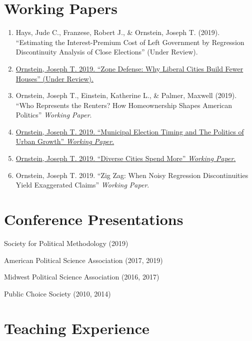 \documentclass[letterpaper]{article}
\renewenvironment{itemize}{
  \begin{list}{}{
    \setlength{\leftmargin}{1.5em}
  }
}{
  \end{list}
}
\begin{document}
\section*{Working Papers}
\begin{enumerate}
\item Hays, Jude C., Franzese, Robert J., \& Ornstein, Joseph T. (2019). ``Estimating the Interest-Premium Cost of Left Government by Regression Discontinuity Analysis of Close Elections'' (Under Review).
\item \href{https://joeornstein.github.io/papers/ornstein-zone-defense.pdf}{Ornstein, Joseph T. 2019. ``Zone Defense: Why Liberal Cities Build Fewer Houses'' (Under Review).}
\item Ornstein, Joseph T., Einstein, Katherine L., \& Palmer, Maxwell (2019). ``Who Represents the Renters? How Homeownership Shapes American Politics'' \textit{Working Paper}.
\item \href{https://joeornstein.github.io/ElectionTiming.html}{Ornstein, Joseph T. 2019. ``Municipal Election Timing and The Politics of Urban Growth'' \textit{Working Paper}.}
\item \href{https://joeornstein.github.io/papers/dcsm.pdf}{Ornstein, Joseph T. 2019. ``Diverse Cities Spend More'' \textit{Working Paper}.}
\item Ornstein, Joseph T. 2019. ``Zig Zag: When Noisy Regression Discontinuities Yield Exaggerated Claims'' \textit{Working Paper}.
\end{enumerate}

\hrulefill

\section*{Conference Presentations}
\begin{itemize}
\item Society for Political Methodology (2019)
\item American Political Science Association (2017, 2019)
\item Midwest Political Science Association (2016, 2017)
\item Public Choice Society (2010, 2014)
\end{itemize}

\hrulefill

\section*{Teaching Experience}
\end{document}
